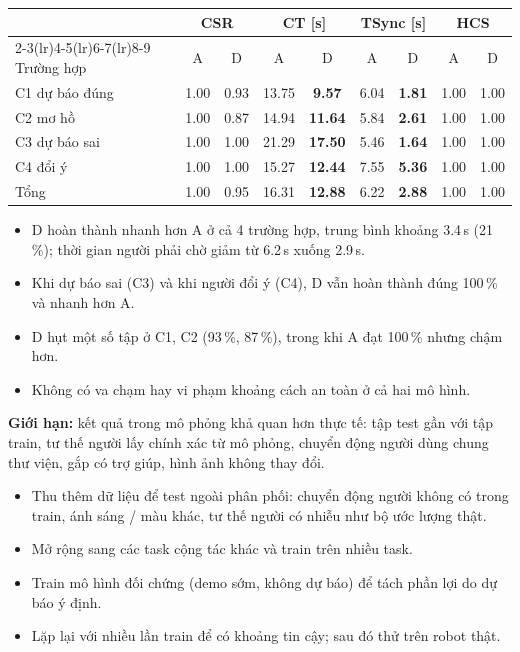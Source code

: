 \documentclass[11pt]{article}
\newcommand{\muc}[1]{\par\smallskip{\large\bfseries #1}\par}
\begin{document}
\begin{center}
\begin{tabular}{lcccccccc}
\toprule
 & \multicolumn{2}{c}{CSR} & \multicolumn{2}{c}{CT [s]} & \multicolumn{2}{c}{TSync [s]} & \multicolumn{2}{c}{HCS} \\
\cmidrule(lr){2-3}\cmidrule(lr){4-5}\cmidrule(lr){6-7}\cmidrule(lr){8-9}
Trường hợp & A & D & A & D & A & D & A & D \\
\midrule
C1 dự báo đúng & 1.00 & 0.93 & 13.75 & \textbf{9.57}  & 6.04 & \textbf{1.81} & 1.00 & 1.00 \\
C2 mơ hồ       & 1.00 & 0.87 & 14.94 & \textbf{11.64} & 5.84 & \textbf{2.61} & 1.00 & 1.00 \\
C3 dự báo sai  & 1.00 & 1.00 & 21.29 & \textbf{17.50} & 5.46 & \textbf{1.64} & 1.00 & 1.00 \\
C4 đổi ý       & 1.00 & 1.00 & 15.27 & \textbf{12.44} & 7.55 & \textbf{5.36} & 1.00 & 1.00 \\
\midrule
Tổng           & 1.00 & 0.95 & 16.31 & \textbf{12.88} & 6.22 & \textbf{2.88} & 1.00 & 1.00 \\
\bottomrule
\end{tabular}
\end{center}

\begin{itemize}
  \item D hoàn thành nhanh hơn A ở cả 4 trường hợp, trung bình khoảng 3.4\,s (21\,\%); thời gian người phải chờ
  giảm từ 6.2\,s xuống 2.9\,s.
  \item Khi dự báo sai (C3) và khi người đổi ý (C4), D vẫn hoàn thành đúng 100\,\% và nhanh hơn A.
  \item D hụt một số tập ở C1, C2 (93\,\%, 87\,\%), trong khi A đạt 100\,\% nhưng chậm hơn.
  \item Không có va chạm hay vi phạm khoảng cách an toàn ở cả hai mô hình.
\end{itemize}

\textbf{Giới hạn:} kết quả trong mô phỏng khả quan hơn thực tế: tập test gần với tập train, tư thế người lấy chính
xác từ mô phỏng, chuyển động người dùng chung thư viện, gắp có trợ giúp, hình ảnh không thay đổi.

\muc{3. Hướng triển khai tiếp}
\begin{itemize}
  \item Thu thêm dữ liệu để test ngoài phân phối: chuyển động người không có trong train, ánh sáng / màu khác,
  tư thế người có nhiễu như bộ ước lượng thật.
  \item Mở rộng sang các task cộng tác khác và train trên nhiều task.
  \item Train mô hình đối chứng (demo sớm, không dự báo) để tách phần lợi do dự báo ý định.
  \item Lặp lại với nhiều lần train để có khoảng tin cậy; sau đó thử trên robot thật.
\end{itemize}
\end{document}
